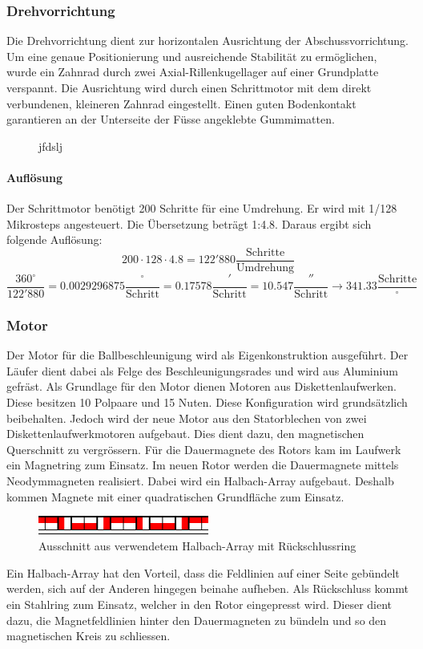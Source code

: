 \subsubsection{Drehvorrichtung}
Die Drehvorrichtung dient zur horizontalen Ausrichtung der 
Abschussvorrichtung. Um eine genaue Positionierung und ausreichende Stabilität 
zu ermöglichen, wurde ein Zahnrad durch zwei Axial-Rillenkugellager auf einer 
Grundplatte verspannt. Die Ausrichtung wird durch einen Schrittmotor mit dem 
direkt verbundenen, kleineren Zahnrad eingestellt. Einen guten Bodenkontakt 
garantieren an der Unterseite der Füsse angeklebte Gummimatten.

\begin{figure}[h!]          
    \centering             
    \caption{jfdslj}
    \label{fig:hhjfdhfd}        
\end{figure}

\paragraph{Auflösung}
Der Schrittmotor benötigt 200 Schritte für eine Umdrehung. Er wird mit 1/128 
Mikrosteps angesteuert. Die Übersetzung beträgt 1:4.8. Daraus ergibt sich 
folgende Auflösung: 
\[ 200 \cdot 128 \cdot 4.8 = 122'880 \frac{\text{Schritte}}{\text{Umdrehung}}  \]
\[ \frac{360^\circ}{122'880} = 0.0029296875 \frac{^\circ}{\text{Schritt}} 
= 0.17578 \frac{'}{\text{Schritt}} = 10.547 \frac{''}{\text{Schritt}}
\rightarrow 341.33 \frac{\text{Schritte}}{^\circ}\]

\subsubsection{Motor}
Der Motor für die Ballbeschleunigung wird als Eigenkonstruktion ausgeführt.  
Der Läufer dient dabei als Felge des Beschleunigungsrades und wird aus 
Aluminium gefräst. Als Grundlage für den Motor dienen Motoren aus 
Diskettenlaufwerken. Diese besitzen 10 Polpaare und 15 Nuten. Diese 
Konfiguration wird grundsätzlich beibehalten. Jedoch wird der neue Motor aus 
den Statorblechen von zwei Diskettenlaufwerkmotoren aufgebaut. Dies dient 
dazu, den magnetischen Querschnitt zu vergrössern. Für die Dauermagnete des 
Rotors kam im Laufwerk ein Magnetring zum Einsatz. Im neuen Rotor werden die 
Dauermagnete mittels Neodymmagneten realisiert. Dabei wird ein Halbach-Array 
aufgebaut. Deshalb kommen Magnete mit einer quadratischen Grundfläche zum 
Einsatz. 
\begin{figure}[h!]
    \centering
    \includegraphics[width=0.5\textwidth]{fig/halbach.pdf}
    \caption{Ausschnitt aus verwendetem Halbach-Array mit Rückschlussring}
    \label{fig:halbach}
\end{figure}
Ein Halbach-Array hat den Vorteil, dass die Feldlinien auf einer 
Seite gebündelt werden, sich auf der Anderen hingegen beinahe aufheben. 
Als Rückschluss kommt ein Stahlring zum Einsatz, welcher in den Rotor 
eingepresst wird. Dieser dient dazu, die Magnetfeldlinien hinter den 
Dauermagneten zu bündeln und so den magnetischen Kreis zu schliessen. 

